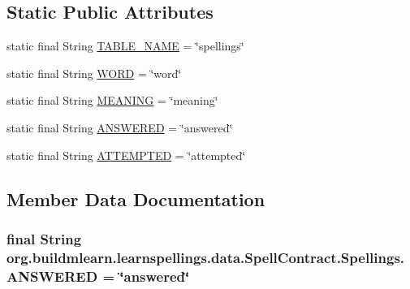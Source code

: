 \subsection*{Static Public Attributes}
\begin{DoxyCompactItemize}
\item 
static final String \hyperlink{classorg_1_1buildmlearn_1_1learnspellings_1_1data_1_1SpellContract_1_1Spellings_a8eda8e58ff9bf6c1d1ab5de4d2744ec3}{T\+A\+B\+L\+E\+\_\+\+N\+A\+ME} = \char`\"{}spellings\char`\"{}
\item 
static final String \hyperlink{classorg_1_1buildmlearn_1_1learnspellings_1_1data_1_1SpellContract_1_1Spellings_ac4bea7e7b831f1f8db8ee1c2b20efe80}{W\+O\+RD} = \char`\"{}word\char`\"{}
\item 
static final String \hyperlink{classorg_1_1buildmlearn_1_1learnspellings_1_1data_1_1SpellContract_1_1Spellings_a9c581ae6ec0030a4faf5143cba8e16bf}{M\+E\+A\+N\+I\+NG} = \char`\"{}meaning\char`\"{}
\item 
static final String \hyperlink{classorg_1_1buildmlearn_1_1learnspellings_1_1data_1_1SpellContract_1_1Spellings_ab3e6df45d7530861f19c6ed7783c646b}{A\+N\+S\+W\+E\+R\+ED} = \char`\"{}answered\char`\"{}
\item 
static final String \hyperlink{classorg_1_1buildmlearn_1_1learnspellings_1_1data_1_1SpellContract_1_1Spellings_a4743b17ff7e4ed23295b3afb38e870dc}{A\+T\+T\+E\+M\+P\+T\+ED} = \char`\"{}attempted\char`\"{}
\end{DoxyCompactItemize}


\subsection{Member Data Documentation}
\subsubsection[{\texorpdfstring{A\+N\+S\+W\+E\+R\+ED}{ANSWERED}}]{\setlength{\rightskip}{0pt plus 5cm}final String org.\+buildmlearn.\+learnspellings.\+data.\+Spell\+Contract.\+Spellings.\+A\+N\+S\+W\+E\+R\+ED = \char`\"{}answered\char`\"{}\hspace{0.3cm}{\ttfamily [static]}}\hypertarget{classorg_1_1buildmlearn_1_1learnspellings_1_1data_1_1SpellContract_1_1Spellings_ab3e6df45d7530861f19c6ed7783c646b}{}\label{classorg_1_1buildmlearn_1_1learnspellings_1_1data_1_1SpellContract_1_1Spellings_ab3e6df45d7530861f19c6ed7783c646b}
